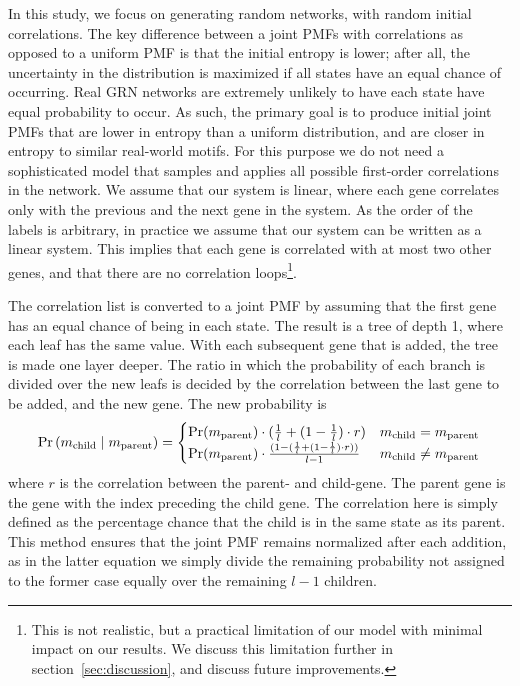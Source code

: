 \documentclass[../main.tex]{subfiles}
\begin{document}
In this study, we focus on generating random networks, with random initial correlations.
The key difference between a joint PMFs with correlations as opposed to a uniform PMF is that the initial entropy is lower; after all, the uncertainty in the distribution is maximized if all states have an equal chance of occurring.
Real GRN networks are extremely unlikely to have each state have equal probability to occur.
As such, the primary goal is to produce initial joint PMFs that are lower in entropy than a uniform distribution, and are closer in entropy to similar real-world motifs.
For this purpose we do not need a sophisticated model that samples and applies all possible first-order correlations in the network.
We assume that our system is linear, where each gene correlates only with the previous and the next gene in the system.
As the order of the labels is arbitrary, in practice we assume that our system can be written as a linear system.
This implies that each gene is correlated with at most two other genes, and that there are no correlation loops\footnote{This is not realistic, but a practical limitation of our model with minimal impact on our results. We discuss this limitation further in section~\ref{sec:discussion}, and discuss future improvements.}.

The correlation list is converted to a joint PMF by assuming that the first gene has an equal chance of being in each state.
The result is a tree of depth 1, where each leaf has the same value.
With each subsequent gene that is added, the tree is made one layer deeper.
The ratio in which the probability of each branch is divided over the new leafs is decided by the correlation between the last gene to be added, and the new gene.
The new probability is
%
\begin{equation}
\label{parentchild}
 \Pr\left( m_\mathrm{child} \;\middle|\; m_\mathrm{parent} \right) =
    \begin{cases}
    \Pr(m_\mathrm{parent}) \cdot (\frac{1}{l} + (1 - \frac{1}{l}) \cdot r) &  m_\mathrm{child} = m_\mathrm{parent} \\
    \Pr(m_\mathrm{parent}) \cdot \frac{(1 - (\frac{1}{l} + (1 - \frac{1}{l}) \cdot r))}{l-1} &  m_\mathrm{child} \neq m_\mathrm{parent} \\
    \end{cases}
\end{equation}
%
where $r$ is the correlation between the parent- and child-gene.
The parent gene is the gene with the index preceding the child gene.
The correlation here is simply defined as the percentage chance that the child is in the same state as its parent.
This method ensures that the joint PMF remains normalized after each addition, as in the latter equation we simply divide the remaining probability not assigned to the former case equally over the remaining $l-1$ children.
\end{document}
